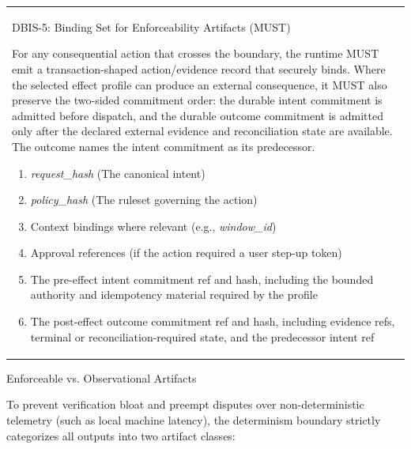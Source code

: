 \documentclass[
  11pt,
]{article}
\providecommand{\tightlist}{%
  \setlength{\itemsep}{0pt}\setlength{\parskip}{0pt}}
\begin{document}
\begin{longtable}[]{@{}
  >{\raggedright\arraybackslash}p{}@{}}
\toprule\noalign{}
 \\
\midrule\noalign{}
\endhead
\bottomrule\noalign{}
\endlastfoot
DBIS-5: Binding Set for Enforceability Artifacts (MUST)

For any consequential action that crosses the boundary, the runtime MUST
emit a transaction-shaped action/evidence record that securely binds. Where
the selected effect profile can produce an external consequence, it MUST also
preserve the two-sided commitment order: the durable intent commitment is
admitted before dispatch, and the durable outcome commitment is admitted only
after the declared external evidence and reconciliation state are available.
The outcome names the intent commitment as its predecessor.

\begin{enumerate}
\def\labelenumi{\arabic{enumi}.}
\tightlist
\item
  \emph{request\_hash} (The canonical intent)
\item
  \emph{policy\_hash} (The ruleset governing the action)
\item
  Context bindings where relevant (e.g., \emph{window\_id})
\item
  Approval references (if the action required a user step-up token)
\item
  The pre-effect intent commitment ref and hash, including the bounded
  authority and idempotency material required by the profile
\item
  The post-effect outcome commitment ref and hash, including evidence refs,
  terminal or reconciliation-required state, and the predecessor intent ref
\end{enumerate} \\
\end{longtable}

Enforceable vs. Observational Artifacts

To prevent verification bloat and preempt disputes over
non-deterministic telemetry (such as local machine latency), the
determinism boundary strictly categorizes all outputs into two artifact
classes:
\end{document}
